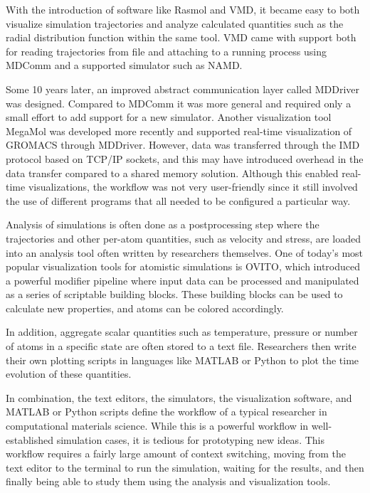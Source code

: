 \documentclass[12pt,a4paper,final]{iopart}
\begin{document}
With the introduction of software like Rasmol\cite{sayle1995rasmol} and VMD\cite{Humphrey1996Vmd},
it became easy to both visualize simulation trajectories and analyze calculated quantities such as the radial distribution function within the same tool. 
VMD came with support both for reading trajectories from file and attaching to a
running process using MDComm\cite{nelson1995mdscope} and a supported simulator such as NAMD.

Some 10 years later, an improved abstract communication layer called MDDriver\cite{delalande2009complex} was designed.
Compared to MDComm it was more general and required only a small effort to add support for a new simulator. Another visualization tool MegaMol\cite{grottel2015megamol} was developed more recently and supported real-time visualization of GROMACS through MDDriver.
However, data was transferred through the IMD protocol based on TCP/IP sockets\cite{delalande2009complex}, and this may have introduced
overhead in the data transfer compared to a shared memory solution.
Although this enabled real-time visualizations, the workflow was not very user-friendly since it still involved
the use of different programs that all needed to be configured a particular way.

Analysis of simulations is often done as a postprocessing step where the trajectories and other 
per-atom quantities, such as velocity and stress, are loaded into an analysis tool often written by researchers themselves.
One of today's most popular visualization tools for atomistic simulations is OVITO\cite{Stukowski2009Visualization},
which introduced a powerful modifier pipeline where input data can be processed and manipulated as a series of scriptable building blocks.
These building blocks can be used to calculate new properties, and atoms can be colored accordingly.

In addition, aggregate scalar quantities such as temperature, pressure or number of atoms in a specific state are often stored to a
text file. Researchers then write their own plotting scripts in languages like MATLAB or Python
to plot the time evolution of these quantities. 

In combination, the text editors, the simulators, the visualization software, and MATLAB or Python scripts define the workflow of a typical researcher in computational
materials science.
While this is a powerful workflow in well-established simulation cases,
it is tedious for prototyping new ideas.
This workflow requires a fairly large amount of context switching,
moving from the text editor to the terminal to run the simulation,
waiting for the results, and then finally being able to study them using the analysis
and visualization tools.
\end{document}
